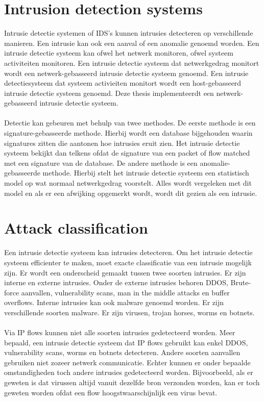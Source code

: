 \begin{samenvatting}
\section{Intrusion detection systems}
Intrusie detectie systemen of IDS's kunnen intrusies detecteren op verschillende manieren. Een intrusie kan ook een aanval of een anomalie genoemd worden. Een intrusie detectie systeem kan ofwel het netwerk monitoren, ofwel systeem activiteiten monitoren. Een intrusie detectie systeem dat netwerkgedrag monitort wordt een netwerk-gebasseerd intrusie detectie systeem genoemd. Een intrusie detectiesysteem dat systeem activieiten monitort wordt een host-gebasseerd intrusie detectie systeem genoemd. Deze thesis implementeerdt een netwerk-gebasseerd intrusie detectie systeem. \\
\\
Detectie kan gebeuren met behulp van twee methodes. De eerste methode is een signature-gebasseerde methode. Hierbij wordt een database bijgehouden waarin signatures zitten die aantonen hoe intrusies eruit zien. Het intrusie detectie systeem bekijkt dan telkens ofdat de signature van een packet of flow matched met een signature van de database. De andere methode is een anomalie-gebasseerde methode. Hierbij stelt het intrusie detectie systeem een statistisch model op wat normaal netwerkgedrag voorstelt. Alles wordt vergeleken met dit model en als er een afwijking opgemerkt wordt, wordt dit gezien als een intrusie.

\section{Attack classification}
Een intrusie detectie systeem kan intrusies detecteren. Om het intrusie detectie systeem efficienter te maken, moet exacte classificatie van een intrusie mogelijk zijn. Er wordt een onderscheid gemaakt tussen twee soorten intrusies. Er zijn interne en externe intrusies. Onder de externe intrusies behoren DDOS, Brute-force aanvallen, vulnerability scans, man in the middle attacks en buffer overflows. Interne intrusies kan ook malware genoemd worden. Er zijn verschillende soorten malware. Er zijn virusen, trojan horses, worms en botnets. \\
\\
Via IP flows kunnen niet alle soorten intrusies gedetecteerd worden. Meer bepaald, een intrusie detectie systeem dat IP flows gebruikt kan enkel DDOS, vulnerability scans, worms en botnets detecteren. Andere soorten aanvallen gebruiken niet zozeer netwerk communicatie. Echter kunnen er onder bepaalde omstandigheden toch andere intrusies gedetecteerd worden. Bijvoorbeeld, als er geweten is dat virussen altijd vanuit dezelfde bron verzonden worden, kan er toch geweten worden ofdat een flow hoogstwaarschijnlijk een virus bevat.


\end{samenvatting}
